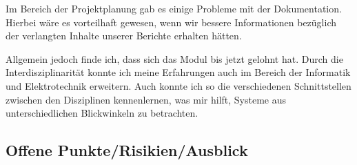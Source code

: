Im Bereich der Projektplanung gab es einige Probleme mit der Dokumentation. Hierbei wäre es vorteilhaft gewesen, wenn wir bessere Informationen bezüglich der verlangten Inhalte unserer Berichte erhalten hätten.

Allgemein jedoch finde ich, dass sich das Modul bis jetzt gelohnt hat. Durch die Interdisziplinarität konnte ich meine Erfahrungen auch im Bereich der Informatik und Elektrotechnik erweitern. Auch konnte ich so die verschiedenen Schnittstellen zwischen den Disziplinen kennenlernen, was mir hilft, Systeme aus unterschiedlichen Blickwinkeln zu betrachten.

\subsection{Offene Punkte/Risikien/Ausblick}

